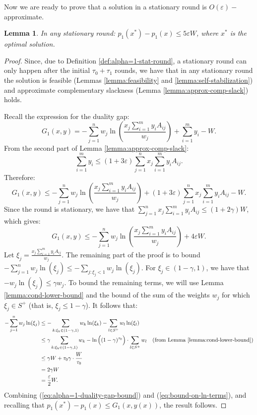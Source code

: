 \documentclass[11pt]{article}
\newtheorem{lemma}[theorem]{Lemma}
\begin{document}
Now we are ready to prove that a solution in a stationary round is $O(\varepsilon)-$approximate.
\begin{lemma}\label{lemma:alpha=1-stat-round}
In any stationary round: $p_1(x^*) - p_1(x)\leq 5\varepsilon W$, where $x^*$ is the optimal solution.
\end{lemma}
\begin{proof}
Since, due to Definition \ref{def:alpha=1-stat-round}, a stationary round can only happen after the initial $\tau_0 + \tau_1$ rounds, we have that in any stationary round the solution is feasible (Lemmas \ref{lemma:feasibility} and \ref{lemma:self-stabilization}) and approximate complementary slackness (Lemma \ref{lemma:approx-comp-slack}) holds. 

Recall the expression \iffalse(\ref{eq:duality-gap-proportional})\fi for the duality gap:
\begin{equation*}
G_1(x, y) =  - \sum_{j=1}^n w_j \ln\left(\frac{x_j\sum_{i=1}^m y_i A_{ij}}{w_j}\right)+\sum_{i=1}^m y_i -W.
\end{equation*}
From the second part of Lemma \ref{lemma:approx-comp-slack}:
\begin{equation*}
\sum_{i=1}^m y_i\leq (1+3\varepsilon)\sum_{j=1}^nx_j\sum_{i=1}^m y_i A_{ij}.
\end{equation*}
Therefore:
\begin{equation*}
G_1(x, y) \leq  - \sum_{j=1}^n w_j \ln\left(\frac{x_j\sum_{i=1}^m y_i A_{ij}}{w_j}\right)+(1+3\varepsilon)\sum_{j=1}^nx_j\sum_{i=1}^m y_i A_{ij} -W.
\end{equation*}
Since the round is stationary, we have that $\sum_{j=1}^nx_j\sum_{i=1}^m y_i A_{ij}\leq (1+2\gamma)W$, which gives:
\begin{equation}
G_1(x, y) \leq  - \sum_{j=1}^n w_j \ln\left(\frac{x_j\sum_{i=1}^m y_i A_{ij}}{w_j}\right)+4\varepsilon W. \label{eq:alpha=1-duality-gap-bound}
\end{equation}
Let $\xi_j = \frac{x_j\sum_{i=1}^m y_i A_{ij}}{w_j}$. The remaining part of the proof is to bound $-\sum_{j=1}^n w_j\ln(\xi_j)\leq -\sum_{j:\xi_j < 1} w_j \ln(\xi_j)$. 
For $\xi_j \in(1-\gamma, 1)$, we have that $-w_j\ln(\xi_j)\leq \gamma w_j$. To bound the remaining terms, we will use Lemma \ref{lemma:cond-lower-bound} and the bound of the sum of the weights $w_j$ for which $\xi_j \in S^+$ (that is, $\xi_j \leq 1-\gamma$). It follows that:
\begin{align}
-\sum_{j=1}^n w_j\ln(\xi_j)&\leq -\sum_{k:\xi_k\in(1-\gamma, 1)}w_k \ln(\xi_k) - \sum_{l\in S^+}w_l\ln(\xi_l)\notag\\
&\leq \gamma \sum_{k:\xi_k\in(1-\gamma, 1)}w_k -\ln\Big((1-\gamma)^{\tau_0}\Big)\cdot \sum_{l\in S^+}w_l \quad(\text{from Lemma \ref{lemma:cond-lower-bound}})\notag\\
&\leq \gamma W + \tau_0 {\gamma} \cdot\frac{W}{\tau_0}\notag\\
&= 2\gamma W \notag\\
&= \frac{\varepsilon}{2}W. \label{eq:bound-on-ln-terms}
\end{align}
Combining (\ref{eq:alpha=1-duality-gap-bound}) and (\ref{eq:bound-on-ln-terms}), and recalling that $p_1(x^*)-p_1(x)\leq G_1(x, y(x))$, the result follows.
\end{proof}
\end{document}

